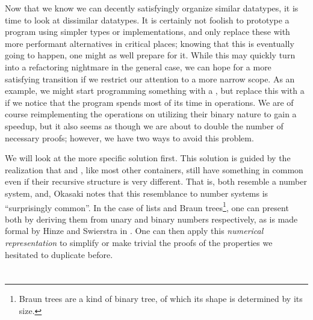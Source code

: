 

Now that we know we can decently satisfyingly organize similar datatypes, it is time to look at dissimilar datatypes. It is certainly not foolish to prototype a program using simpler types or implementations, and only replace these with more performant alternatives in critical places; knowing that this is eventually going to happen, one might as well prepare for it. While this may quickly turn into a refactoring nightmare in the general case, we can hope for a more satisfying transition if we restrict our attention to a more narrow scope. As an example, we might start programming something with a , but replace this with a  if we notice that the program spends most of its time in  operations. We are of course reimplementing the operations on  utilizing their binary nature to gain a speedup, but it also seems as though we are about to double the number of necessary proofs; however, we have two ways to avoid this problem. 

We will look at the more specific solution first. This solution is guided by the realization that  and , like most other containers, still have something in common even if their recursive structure is very different. That is, both resemble a number system, and, Okasaki \cite{purelyfunctional} notes that this resemblance to number systems is ``surprisingly common''. In the case of lists and Braun trees\footnote{Braun trees are a kind of binary tree, of which its shape is determined by its size.}, one can present both by deriving them from unary and binary numbers respectively, as is made formal by Hinze and Swierstra in \cite{calcdata}. One can then apply this \textit{numerical representation} to simplify or make trivial the proofs of the properties we hesitated to duplicate before.



\section{}

